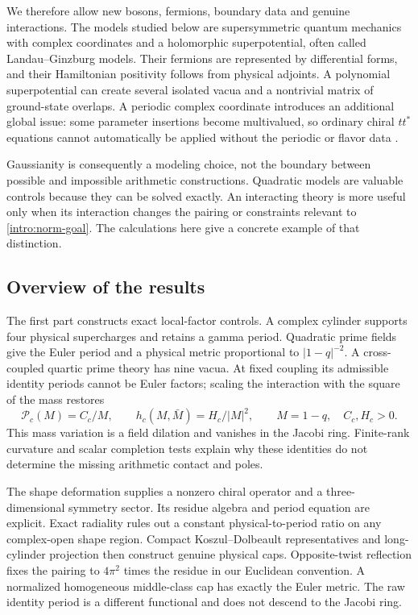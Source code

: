 We therefore allow new bosons, fermions, boundary data and genuine interactions. The models studied below are supersymmetric quantum mechanics with complex coordinates and a holomorphic superpotential, often called Landau--Ginzburg models. Their fermions are represented by differential forms, and their Hamiltonian positivity follows from physical adjoints. A polynomial superpotential can create several isolated vacua and a nontrivial matrix of ground-state overlaps. A periodic complex coordinate introduces an additional global issue: some parameter insertions become multivalued, so ordinary chiral $tt^*$ equations cannot automatically be applied without the periodic or flavor data \cite{CGV}.

Gaussianity is consequently a modeling choice, not the boundary between possible and impossible arithmetic constructions. Quadratic models are valuable controls because they can be solved exactly. An interacting theory is more useful only when its interaction changes the pairing or constraints relevant to \eqref{intro:norm-goal}. The calculations here give a concrete example of that distinction.

\subsection{Overview of the results}
The first part constructs exact local-factor controls. A complex
cylinder supports four physical supercharges and retains a gamma
period. Quadratic prime fields give the Euler period and a physical
metric proportional to $|1-q|^{-2}$. A cross-coupled quartic prime
theory has nine vacua. At fixed coupling its admissible identity
periods cannot be Euler factors; scaling the interaction with the
square of the mass restores
\begin{equation}\label{intro:interacting-success}
\mathcal P_c(M)=C_c/M,\qquad h_c(M,\bar M)=H_c/|M|^2,
\qquad M=1-q,\quad C_c,H_c>0.
\end{equation}
This mass variation is a field dilation and vanishes in the Jacobi
ring. Finite-rank curvature and scalar completion tests explain
why these identities do not determine the missing arithmetic
contact and poles.

The shape deformation supplies a nonzero chiral operator and a
three-dimensional symmetry sector. Its residue algebra and
period equation are explicit. Exact radiality rules out a constant
physical-to-period ratio on any complex-open shape region.
Compact Koszul--Dolbeault representatives and long-cylinder
projection then construct genuine physical caps. Opposite-twist
reflection fixes the pairing to $4\pi^2$ times the residue in our
Euclidean convention. A normalized homogeneous middle-class cap
has exactly the Euler metric. The raw identity period is a
different functional and does not descend to the Jacobi ring.

